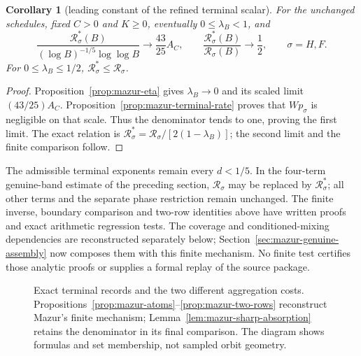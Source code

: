 \documentclass[11pt]{article}
\newtheorem{corollary}[proposition]{Corollary}
\theoremstyle{remark}\newtheorem{remark}[proposition]{Remark}
\begin{document}
\begin{corollary}[leading constant of the refined terminal scalar]
\label{cor:mazur-sharp-terminal}
For the unchanged schedules, fixed $C>0$ and $K\ge0$, eventually
$0\le\lambda_B<1$, and
\[
 \frac{\mathcal R_\sigma^*(B)}{(\log B)^{-1/5}\log\log B}
       \longrightarrow\frac{43}{25}A_C,\qquad
 \frac{\mathcal R_\sigma^*(B)}{\mathcal R_\sigma(B)}
       \longrightarrow\frac12,\qquad \sigma=H,F.
\]
For $0\le\lambda_B\le1/2$, $\mathcal R_\sigma^*\le\mathcal R_\sigma$.
\end{corollary}
\begin{proof}
Proposition~\ref{prop:mazur-eta} gives $\lambda_B\to0$ and its
scaled limit $(43/25)A_C$. Proposition~\ref{prop:mazur-terminal-rate}
proves that $Wp_\sigma$ is negligible on that scale.
Thus the denominator tends to one, proving the first limit.
The exact relation is
$\mathcal R_\sigma^*=\mathcal R_\sigma/[2(1-\lambda_B)]$;
the second limit and the finite comparison follow.
\end{proof}

The admissible terminal exponents remain every $d<1/5$.
In the four-term genuine-band estimate of the preceding section,
$\mathcal R_\sigma$ may be replaced by $\mathcal R_\sigma^*$;
all other terms and the separate phase restriction remain unchanged.
The finite inverse, boundary comparison and two-row identities above
have written proofs and exact arithmetic regression tests.
The coverage and conditioned-mixing dependencies are reconstructed
separately below; Section~\ref{sec:mazur-genuine-assembly} now composes them
with this finite mechanism. No finite test certifies those analytic proofs
or supplies a formal replay of the source package.

\begin{figure}[ht]
\centering
{}
\caption{Exact terminal records and the two different aggregation costs.
Propositions~\ref{prop:mazur-atoms}--\ref{prop:mazur-two-rows}
reconstruct Mazur's finite mechanism; Lemma~\ref{lem:mazur-sharp-absorption}
retains the denominator in its final comparison. The diagram shows
formulas and set membership, not sampled orbit geometry.}
\label{fig:mazur-finite}
\end{figure}
\end{document}
